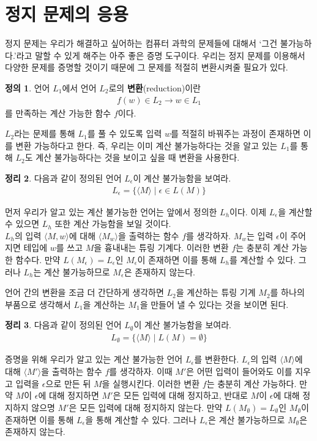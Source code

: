 \documentclass[b5paper, 11pt]{book}
\theoremstyle{definition}
\newtheorem{defn}{정의}[chapter]
\newtheorem{thm}[defn]{정리}
\newenvironment{pf*}{\pushQED{\qed}\pf}
{\popQED\endpf}
\begin{document}
\section{정지 문제의 응용}
정지 문제는 우리가 해결하고 싶어하는 컴퓨터 과학의 문제들에 대해서 `그건 불가능하다.'라고 말할 수 있게
해주는 아주 좋은 증명 도구이다. 우리는 정지 문제를 이용해서 다양한 문제를 증명할 것이기 때문에
그 문제를 적절히 변환시켜줄 필요가 있다.
\begin{defn}
    언어 $L_1$에서 언어 $L_2$로의 \textbf{변환}(reduction)이란 
    \begin{align*}
        f(w) \in L_2 \rightarrow w \in L_1 
    \end{align*}
    를 만족하는 계산 가능한 함수 $f$이다.
\end{defn}
$L_2$라는 문제를 통해 $L_1$를 풀 수 있도록 입력 $w$를 적절히 바꿔주는 과정이 존재하면 이를 변환 가능하다고 한다. 즉, 우리는 이미 계산 불가능하다는 것을 알고 있는 $L_1$를 통해 $L_2$도 계산 불가능하다는 것을 보이고 싶을 때 변환을 사용한다. 
\begin{thm}
    다음과 같이 정의된 언어 $L_\epsilon$이 계산 불가능함을 보여라.
    \begin{align*}
        L_\epsilon = \{ \langle M \rangle \;\vert\; \epsilon \in L(M) \}
    \end{align*}
\end{thm}
\begin{pf*}
    먼저 우리가 알고 있는 계산 불가능한 언어는 앞에서 정의한 $L_h$이다. 이제 $L_\epsilon$을 계산할 수 있으면 $L_h$ 또한 계산 가능함을 보일 것이다. 
    \\ $L_h$의 입력 $\langle M , w\rangle$에 대해 $\langle M_w \rangle$을 출력하는  함수 $f$를 생각하자. $M_w$는 입력 $\epsilon$이 주어지면 테입에 $w$를 쓰고 $M$을 흉내내는 튜링 기계다. 이러한 변환 $f$는 충분히 계산 가능한 함수다. 만약 $L(M_\epsilon) = L_\epsilon$인 $M_\epsilon$이 존재하면 이를 통해  $L_h$를 계산할 수 있다. 그러나 $L_h$는 계산 불가능하므로 $M_\epsilon$은 존재하지 않는다.
\end{pf*}
언어 간의 변환을 조금 더 간단하게 생각하면 $L_2$을 계산하는 튜링 기계 $M_2$를 하나의 부품으로 생각해서 $L_1$을 계산하는 $M_1$을 만들어 낼 수 있다는 것을 보이면 된다.
\begin{thm}
    다음과 같이 정의된 언어 $L_\emptyset$이 계산 불가능함을 보여라.
    \begin{align*}
        L_\emptyset = \{ \langle M \rangle \;\vert\; L(M) = \emptyset \}
    \end{align*}
\end{thm}
\begin{pf*}
    증명을 위해 우리가 알고 있는 계산 불가능한 언어 $L_\epsilon$를 변환한다. $L_\epsilon$의 입력 $\langle M \rangle$에 대해 $\langle M' \rangle$을 출력하는 함수 $f$를 생각하자. 이때 $M'$은 어떤 입력이 들어와도 이를 지우고 입력을 $\epsilon$으로 만든 뒤 $M$을 실행시킨다. 이러한 변환 $f$는 충분히 계산 가능하다. 만약 $M$이 $\epsilon$에 대해 정지하면 $M'$은 모든 입력에 대해 정지하고, 반대로 $M$이 $\epsilon$에 대해 정지하지 않으명 $M'$은 모든 입력에 대해 정지하지 않는다. 만약 $L(M_\emptyset) = L_\emptyset$인 $M_\emptyset$이 존재하면 이를 통해 $L_\epsilon$을 통해 계산할 수 있다. 그러나 $L_\epsilon$은 계산 불가능하므로 $M_\emptyset$은 존재하지 않는다.
\end{pf*}
\end{document}
